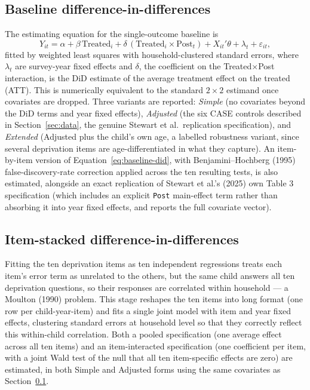 \subsection{Baseline difference-in-differences}
\label{sec:baseline-did}

The estimating equation for the single-outcome baseline is
\begin{equation}
Y_{it} = \alpha + \beta\,\text{Treated}_{i} + \delta\,(\text{Treated}_{i} \times \text{Post}_{t}) + X_{it}'\theta + \lambda_{t} + \varepsilon_{it},
\label{eq:baseline-did}
\end{equation}
fitted by weighted least squares with household-clustered standard errors, where $\lambda_{t}$ are survey-year fixed effects and $\delta$, the coefficient on the Treated$\times$Post interaction, is the DiD estimate of the average treatment effect on the treated (ATT). This is numerically equivalent to the standard $2\times2$ estimand once covariates are dropped. Three variants are reported: \emph{Simple} (no covariates beyond the DiD terms and year fixed effects), \emph{Adjusted} (the six CASE controls described in Section~\ref{sec:data}, the genuine Stewart et al.\ replication specification), and \emph{Extended} (Adjusted plus the child's own age, a labelled robustness variant, since several deprivation items are age-differentiated in what they capture). An item-by-item version of Equation~\ref{eq:baseline-did}, with Benjamini--Hochberg (1995) false-discovery-rate correction applied across the ten resulting tests, is also estimated, alongside an exact replication of Stewart et al.'s (2025) own Table 3 specification (which includes an explicit \texttt{Post} main-effect term rather than absorbing it into year fixed effects, and reports the full covariate vector).

\subsection{Item-stacked difference-in-differences}
\label{sec:item-stacked}

Fitting the ten deprivation items as ten independent regressions treats each item's error term as unrelated to the others, but the same child answers all ten deprivation questions, so their responses are correlated within household --- a Moulton (1990) problem. This stage reshapes the ten items into long format (one row per child-year-item) and fits a single joint model with item and year fixed effects, clustering standard errors at household level so that they correctly reflect this within-child correlation. Both a pooled specification (one average effect across all ten items) and an item-interacted specification (one coefficient per item, with a joint Wald test of the null that all ten item-specific effects are zero) are estimated, in both Simple and Adjusted forms using the same covariates as Section~\ref{sec:baseline-did}.

